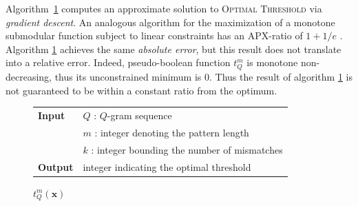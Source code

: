 Algorithm~\ref{alg:qgram-threshold-apx} computes an approximate solution to \textsc{Optimal Threshold} via \emph{gradient descent}.
An analogous algorithm for the maximization of a monotone submodular function subject to linear constraints has an APX-ratio of $1 + 1/e$ \citep{Vazirani2001}.
Algorithm \ref{alg:qgram-threshold-apx} achieves the same \emph{absolute error}, but this result does not translate into a relative error.
Indeed, pseudo-boolean function $t_{Q}^{m}$ is monotone non-decreasing, thus its unconstrained minimum is $0$.
Thus the result of algorithm \ref{alg:qgram-threshold-apx} is not guaranteed to be within a constant ratio from the optimum.


\begin{figure}[b]
\begin{center}
\begin{minipage}[t]{.8\textwidth}
\begin{algorithm}[H]
\begin{tabular}{ll}
\textbf{Input}  & $Q$ : $Q$-gram sequence\\
				& $m$ : integer denoting the pattern length\\
				& $k$ : integer bounding the number of mismatches\\
\textbf{Output} & integer indicating the optimal threshold\\
\end{tabular}
\begin{algorithmic}[1]
\EndWhile
\State \Return $t^m_Q(\mathbf{x})$
\end{algorithmic}
\label{alg:qgram-threshold-apx}
\end{algorithm}
\end{minipage}
\end{center}
\end{figure}


